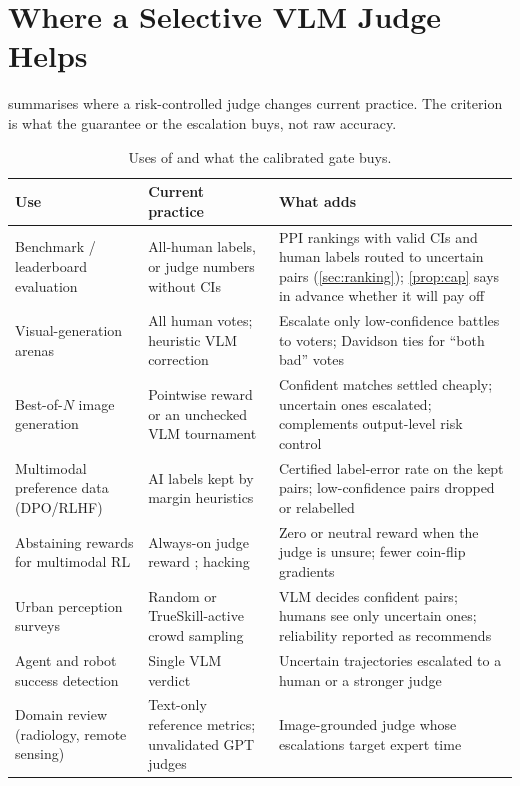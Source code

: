 \section{Where a Selective VLM Judge Helps}\label{sec:applications}

 summarises where a risk-controlled judge changes current practice. The criterion is what the guarantee or the escalation buys, not raw accuracy.

\begin{table}[t]
\centering\small
\caption{Uses of \eaglev{} and what the calibrated gate buys.}\label{tab:apps}
\begin{tabular}{p{3.0cm}p{4.2cm}p{5.6cm}}
\toprule
Use & Current practice & What \eaglev{} adds\\
\midrule
Benchmark / leaderboard evaluation & All-human labels, or judge numbers without CIs & PPI rankings with valid CIs and human labels routed to uncertain pairs (\cref{sec:ranking}); \cref{prop:cap} says in advance whether it will pay off\\
Visual-generation arenas & All human votes; heuristic VLM correction \citep{li2026ksort} & Escalate only low-confidence battles to voters; Davidson ties for ``both bad'' votes\\
Best-of-$N$ image generation & Pointwise reward or an unchecked VLM tournament & Confident matches settled cheaply; uncertain ones escalated; complements output-level risk control \citep{yin2026calibrate}\\
Multimodal preference data (DPO/RLHF) & AI labels kept by margin heuristics \citep{yu2024rlaifv} & Certified label-error rate on the kept pairs; low-confidence pairs dropped or relabelled\\
Abstaining rewards for multimodal RL & Always-on judge reward \citep{wang2025prefgrpo}; hacking \citep{yao2026multimodal} & Zero or neutral reward when the judge is unsure; fewer coin-flip gradients\\
Urban perception surveys & Random or TrueSkill-active crowd sampling \citep{dubey2016deep} & VLM decides confident pairs; humans see only uncertain ones; reliability reported as \citet{mushkani2026benchmarks} recommends\\
Agent and robot success detection & Single VLM verdict \citep{lu2025agentrewardbench,lee2026roboreward} & Uncertain trajectories escalated to a human or a stronger judge\\
Domain review (radiology, remote sensing) & Text-only reference metrics; unvalidated GPT judges & Image-grounded judge whose escalations target expert time\\
\bottomrule
\end{tabular}
\end{table}
